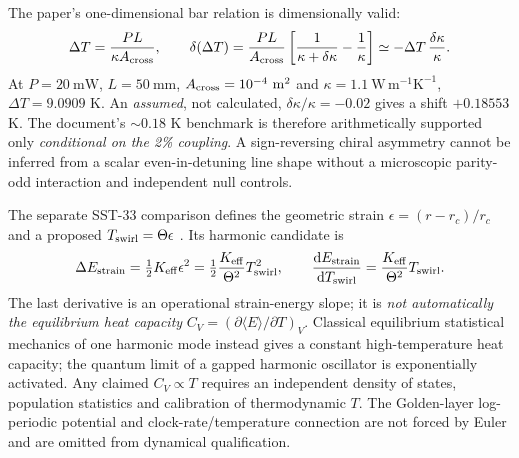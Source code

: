 \documentclass[11pt,a4paper]{article}
\newcommand{\dd}{\mathrm{d}}
\newcommand{\rc}{r_c}
\begin{document}
The paper's one-dimensional bar relation is dimensionally valid:
\begin{equation}
\Delta T=\frac{PL}{\kappa A_{\rm cross}},\qquad
\delta(\Delta T)=\frac{PL}{A_{\rm cross}}\left[\frac1{\kappa+\delta\kappa}-\frac1\kappa\right]
\simeq-\Delta T\,\frac{\delta\kappa}{\kappa}.
\end{equation}
At $P=20\ \mathrm{mW}$, $L=50\ \mathrm{mm}$, $A_{\rm cross}=10^{-4}\ \mathrm{m^2}$ and $\kappa=1.1\ \mathrm{W\,m^{-1}K^{-1}}$, $\Delta T=9.0909$ K. An \emph{assumed}, not calculated, $\delta\kappa/\kappa=-0.02$ gives a shift $+0.18553$ K. The document's $\sim0.18$ K benchmark is therefore arithmetically supported only \emph{conditional on the 2\% coupling}. A sign-reversing chiral asymmetry cannot be inferred from a scalar even-in-detuning line shape without a microscopic parity-odd interaction and independent null controls.

The separate SST-33 comparison defines the geometric strain $\epsilon=(r-\rc)/\rc$ and a proposed $T_{\rm swirl}=\Theta\epsilon$ \cite{SST33compare}. Its harmonic candidate is
\begin{equation}
\Delta E_{\rm strain}=\tfrac12K_{\rm eff}\epsilon^2
=\tfrac12\frac{K_{\rm eff}}{\Theta^2}T_{\rm swirl}^2,\qquad
\frac{\dd E_{\rm strain}}{\dd T_{\rm swirl}}=\frac{K_{\rm eff}}{\Theta^2}T_{\rm swirl}.
\end{equation}
The last derivative is an operational strain-energy slope; it is \emph{not automatically the equilibrium heat capacity} $C_V=(\partial\langle E\rangle/\partial T)_{V}$. Classical equilibrium statistical mechanics of one harmonic mode instead gives a constant high-temperature heat capacity; the quantum limit of a gapped harmonic oscillator is exponentially activated. Any claimed $C_V\propto T$ requires an independent density of states, population statistics and calibration of thermodynamic $T$. The Golden-layer log-periodic potential and clock-rate/temperature connection are not forced by Euler and are omitted from dynamical qualification.
\end{document}
